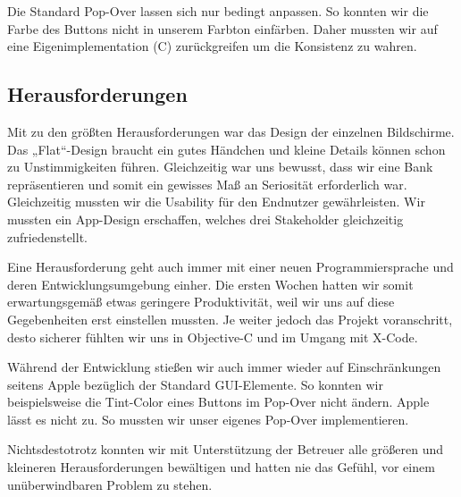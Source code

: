 Die Standard Pop-Over lassen sich nur bedingt anpassen. So konnten wir die Farbe des Buttons nicht in unserem Farbton einfärben. Daher mussten wir auf eine Eigenimplementation (C) zurückgreifen um die Konsistenz zu wahren.


\subsection{Herausforderungen}
	Mit zu den größten Herausforderungen war das Design der einzelnen Bildschirme. Das „Flat“-Design braucht ein gutes Händchen und kleine Details können schon zu Unstimmigkeiten führen. Gleichzeitig war uns bewusst, dass wir eine Bank repräsentieren und somit ein gewisses Maß an Seriosität erforderlich war. Gleichzeitig mussten wir die Usability für den Endnutzer gewährleisten. Wir mussten ein App-Design erschaffen, welches drei Stakeholder gleichzeitig zufriedenstellt.

%

	Eine Herausforderung geht auch immer mit einer neuen Programmiersprache und deren Entwicklungsumgebung einher. Die ersten Wochen hatten wir somit erwartungsgemäß etwas geringere Produktivität, weil wir uns auf diese Gegebenheiten erst einstellen mussten. Je weiter jedoch das Projekt voranschritt, desto sicherer fühlten wir uns in Objective-C und im Umgang mit X-Code.

	Während der Entwicklung stießen wir auch immer wieder auf Einschränkungen seitens Apple bezüglich der Standard GUI-Elemente. So konnten wir beispielsweise die Tint-Color eines Buttons im Pop-Over nicht ändern. Apple lässt es nicht zu. So mussten wir unser eigenes Pop-Over implementieren.

	Nichtsdestotrotz konnten wir mit Unterstützung der Betreuer alle größeren und kleineren Herausforderungen bewältigen und hatten nie das Gefühl, vor einem unüberwindbaren Problem zu stehen.